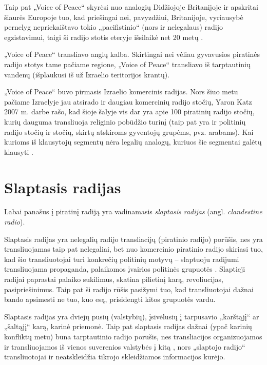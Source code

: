 \documentclass[kursinis-darbas]{vukf}
\begin{document}
Taip pat „Voice of Peace“ skyrėsi nuo analogių Didžiojoje Britanijoje ir apskritai šiaurės Europoje tuo, kad priešingai nei, pavyzdžiui, Britanijoje, vyriausybė pernelyg nepriekaištavo tokio „pacifistinio“ (nors ir nelegalaus) radijo egzistavimui, taigi ši radijo stotis eteryje išsilaikė net 20 metų \cite[p.~159]{os_the_noble_pirate_the_voice_of_peace_offshore_radio_station}.

„Voice of Peace“ transliavo anglų kalba. Skirtingai nei vėliau gyvavusios piratinės radijo stotys tame pačiame regione, „Voice of Peace“ transliavo iš tarptautinių vandenų (išplaukusi iš už Izraelio teritorijos krantų).

„Voice of Peace“ buvo pirmasis Izraelio komercinis radijas. Nors šiuo metu pačiame Izraelyje jau atsirado ir daugiau komercinių radijo stočių, Yaron Katz 2007 m. darbe rašo, kad šioje šalyje vis dar yra apie 100 piratinių radijo stočių, kurių dauguma transliuoja religinio pobūdžio turinį (taip pat yra ir politinių radijo stočių ir stočių, skirtų atskiroms gyventojų grupėms, pvz. arabams). Kai kurioms iš klausytojų segmentų nėra legalių analogų, kuriuos šie segmentai galėtų klausyti \cite[p.389]{yk_the_other_media_alternative_communications_in_israel}.


\section{Slaptasis radijas}

Labai panašus į piratinį radiją yra vadinamasis \emph{slaptasis radijas} (angl. \emph{clandestine radio}).

Slaptasis radijas yra nelegalių radijo transliacijų (piratinio radijo) porūšis, nes yra transliuojamas taip pat nelegaliai, bet nuo komercinio piratinio radijo skiriasi tuo, kad šio transliuotojai turi konkrečių politinių motyvų – slaptuoju radijumi transliuojama propaganda, palaikomos įvairios politinės grupuotės \cite[p.~334]{chs_encyclopedia_of_radio}. Slaptieji radijai paprastai palaiko sukilimus, skatina pilietinį karą, revoliucijas, pasipriešinimus. Taip pat ši radijo rūšis pasižymi tuo, kad transliuotojai dažnai bando apsimesti ne tuo, kuo esą, prisidengti kitos grupuotės vardu.

Slaptasis radijas yra dviejų pusių (valstybių), įsivėlusių į tarpusavio „karštąjį“ ar „šaltąjį“ karą, karinė priemonė. Taip pat slaptasis radijas dažnai (ypač karinių konfliktų metu) būna tarptautinio radijo porūšis, nes transliacijos organizuojamos ir transliuojamos iš vienos suverenios valstybės į kitą \cite[p.~749]{chs_encyclopedia_of_radio}, nors „slaptojo radijo“ transliuotojai ir neatskleidžia tikrojo skleidžiamos informacijos kūrėjo.
\end{document}
